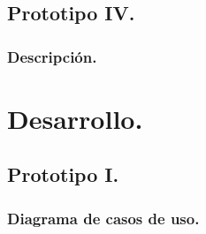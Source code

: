 \documentclass[12pt, a4paper, titlepage]{report}
\begin{document}
	    \section{Prototipo IV.}
	        \subsection{Descripción.}
	            
	        
	        
	        
	        
	    
	\chapter{\textcolor{azulescom}{Desarrollo.}}
		\section{Prototipo I.}
			\subsection{Diagrama de casos de uso.}
\end{document}
